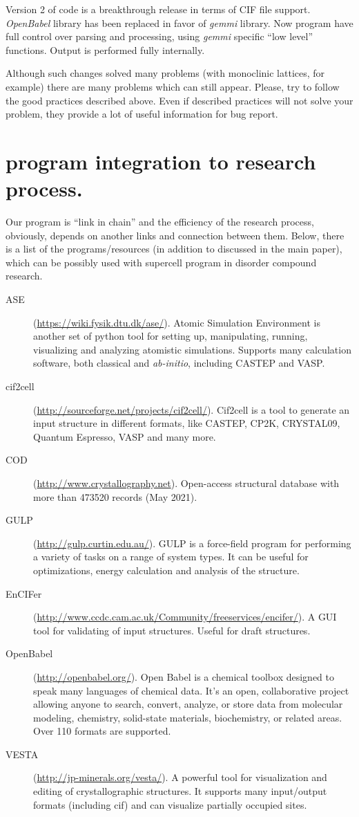\documentclass[a4paper,10pt]{article}
\begin{document}
Version 2 of \sups{} code is a breakthrough release in terms of CIF file support. \mbox{\textit{OpenBabel}} library has been replaced in favor of \mbox{\textit{gemmi}} library. Now \sups{} program have full control over parsing and processing, using \mbox{\textit{gemmi}} specific ``low level'' functions. Output is performed fully internally.

Although such changes solved many problems (with monoclinic lattices, for example) there are many problems which can still appear. Please, try to follow the good practices described above. Even if described practices will not solve your problem, they provide a lot of useful information for bug report.

\FloatBarrier


\section*{\Sups{} program integration to research process.}
Our program is ``link in chain'' and the efficiency of the research process, obviously, depends on another links and connection between them. Below, there is a list of the programs/resources (in addition to discussed in the main paper), which can be possibly used with supercell program in disorder compound research.
\begin{description}
  \item[ASE] (\url{https://wiki.fysik.dtu.dk/ase/}). Atomic Simulation Environment is another set of python tool for setting up, manipulating, running, visualizing and analyzing atomistic simulations. Supports many calculation software, both classical and \textit{ab-initio}, including CASTEP and VASP. 
  \item[cif2cell] (\url{http://sourceforge.net/projects/cif2cell/}). Cif2cell is a tool to generate an input structure in different formats, like CASTEP, CP2K, CRYSTAL09, Quantum Espresso, VASP and many more. 
  \item[COD] (\url{http://www.crystallography.net}). Open-access  structural database with more than \num{473520} records (May 2021). 
  \item[GULP] (\url{http://gulp.curtin.edu.au/}). GULP is a force-field program for performing a variety of tasks on a range of system types. It can be useful for optimizations, energy calculation and analysis of the structure.
  \item[EnCIFer] (\url{http://www.ccdc.cam.ac.uk/Community/freeservices/encifer/}). A GUI tool for validating of \sups{} input structures. Useful for draft structures.
  \item[OpenBabel] (\url{http://openbabel.org/}). Open Babel is a chemical toolbox designed to speak many languages of chemical data. It's an open, collaborative project allowing anyone to search, convert, analyze, or store data from molecular modeling, chemistry, solid-state materials, biochemistry, or related areas. Over 110 formats are supported.
  \item[VESTA] (\url{http://jp-minerals.org/vesta/}). A powerful tool for visualization and editing of crystallographic structures. It supports many input/output formats (including cif) and can visualize partially occupied sites.
\end{description}

 
\end{document}
